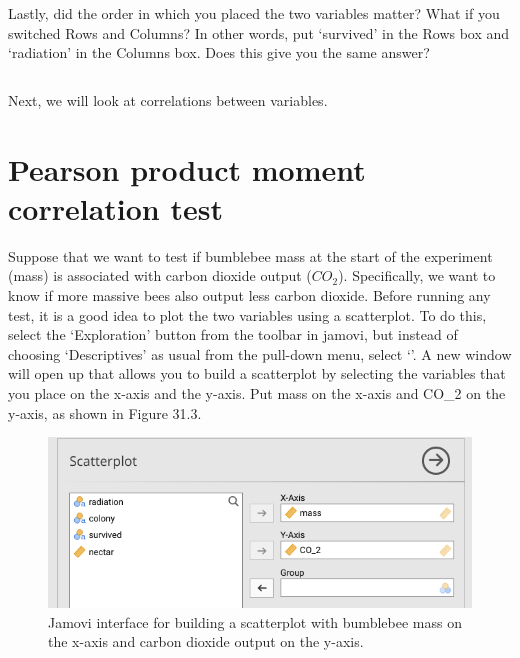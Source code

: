 \documentclass[
  openany]{krantz}
\begin{document}
\begin{verbatim}



\end{verbatim}

Lastly, did the order in which you placed the two variables matter?
What if you switched Rows and Columns?
In other words, put `survived' in the Rows box and `radiation' in the Columns box.
Does this give you the same answer?

\begin{verbatim}

\end{verbatim}

Next, we will look at correlations between variables.

\hypertarget{pearson-product-moment-correlation-test}{%
\section{Pearson product moment correlation test}\label{pearson-product-moment-correlation-test}}

Suppose that we want to test if bumblebee mass at the start of the experiment (mass) is associated with carbon dioxide output (\(CO_{2}\)).
Specifically, we want to know if more massive bees also output less carbon dioxide.
Before running any test, it is a good idea to plot the two variables using a scatterplot.
To do this, select the `Exploration' button from the toolbar in jamovi, but instead of choosing `Descriptives' as usual from the pull-down menu, select `'.
A new window will open up that allows you to build a scatterplot by selecting the variables that you place on the x-axis and the y-axis.
Put mass on the x-axis and CO\_2 on the y-axis, as shown in Figure 31.3.

\begin{figure}
\includegraphics[width=1\linewidth]{img/jamovi_simple_scatterplot} \caption{Jamovi interface for building a scatterplot with bumblebee mass on the x-axis and carbon dioxide output on the y-axis.}\label{fig:unnamed-chunk-135}
\end{figure}
\end{document}
